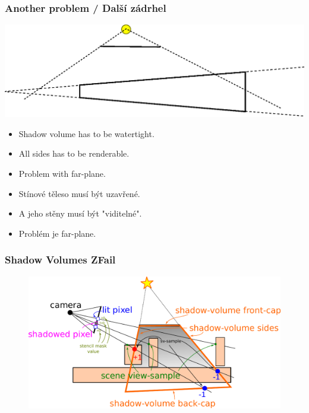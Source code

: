 \begin{frame}\frametitle{Another problem / Další zádrhel}
\includegraphics[width=\textwidth]{pics/shadows/shadowVolumes/svol-cap.eps}
\begin{itemize}
  \item Shadow volume has to be watertight.
  \item All sides has to be renderable.
  \item Problem with far-plane.
\end{itemize}
\begin{itemize}
  \item Stínové těleso musí být uzavřené.
  \item A jeho stěny musí být "viditelné".
  \item Problém je far-plane.
\end{itemize}
\end{frame}

\begin{frame}\frametitle{Shadow Volumes ZFail}
  \begin{figure}[h]
    \includegraphics[width=11.5cm,keepaspectratio]{pics/shadows/shadowVolumes/ZFail}
  \end{figure}
\end{frame}

